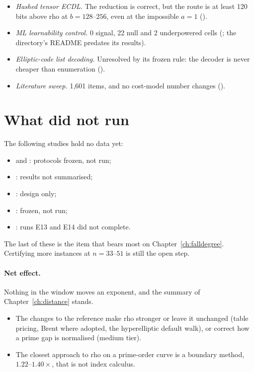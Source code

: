 \begin{itemize}
\item \emph{Hashed tensor ECDL.} The reduction is correct, but the route is
  at least 120 bits above rho at $b=128$--$256$, even at the impossible
  $a=1$ ().
\item \emph{ML learnability control.} 0 signal, 22 null and 2 underpowered
  cells (; the
  directory's README predates its results).
\item \emph{Elliptic-code list decoding.} Unresolved by its frozen rule: the
  decoder is never cheaper than enumeration
  ().
\item \emph{Literature sweep.} 1{,}601 items, and no cost-model number changes
  ().
\end{itemize}

\section{What did not run}\label{sec:nov-blocked}

The following studies hold no data yet:
\begin{itemize}
\item {} and
  : protocols frozen, not run;
\item {}: results not summarised;
\item {}: design only;
\item {}: frozen, not run;
\item {}: runs E13 and E14 did
  not complete.
\end{itemize}
The last of these is the item that bears most on Chapter~\ref{ch:falldegree}.
Certifying more instances at $n=33$--$51$ is still the open step.

\paragraph{Net effect.} Nothing in the window moves an exponent, and the
summary of Chapter~\ref{ch:distance} stands.
\begin{itemize}
\item The changes to the reference make rho stronger or leave it unchanged
  (table pricing, Brent where adopted, the hyperelliptic default walk), or
  correct how a prime gap is normalised (medium tier).
\item The closest approach to rho on a prime-order curve is a boundary
  method, $1.22$--$1.40\times$, that is not index calculus.
\end{itemize}
